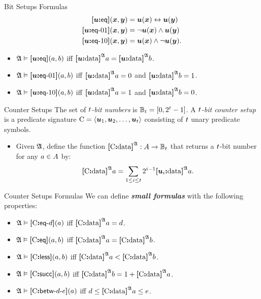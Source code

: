 \documentclass{beamer}
\begin{document}
\begin{frame}{Bit Setups Formulas}
\begin{align*}
  \feq\su(\xx,\yy) &= \su(\xx) \lequ \su(\yy) \\
  \feqOI\su(\xx,\yy) &= \lnot \su(\xx) \land \su(\yy) \\
  \feqIO\su(\xx,\yy) &= \su(\xx) \land \lnot \su(\yy). \\
\end{align*}
\begin{itemize}
  \item
  $\StrA\vDash\feq\su(\ea,\eb)$ iff $\data\su\StrA\ea = \data\su\StrA\eb$.
  
  \item
  $\StrA\vDash\feqOI\su(\ea,\eb)$ iff $\data\su\StrA\ea = 0$ and
  $\data\su\StrA\eb = 1$.
  
  \item
  $\StrA\vDash\feqIO\su(\ea,\eb)$ iff $\data\su\StrA\ea = 1$ and
  $\data\su\StrA\eb = 0$.
\end{itemize}
\end{frame}

\begin{frame}{Counter Setups}
The set of \emph{$\tbit$-bit numbers} is $\Bitnumst = [0, 2^\tbit-1]$.
A \emph{$\tbit$-bit counter setup} is a predicate signature $\CS =
\seq{\suu1,\suu2,\dots,\suu\tbit}$ consisting of $\tbit$ unary predicate
symbols.
\begin{itemize}
  \item
  Given $\StrA$, define the function $\data\CS\StrA : \domA \to \Bitnumst$ that
  returns a $\tbit$-bit number for any $\ea\in\domA$ by:
  \[
    \data\CS\StrA\ea = \sum_{1 \leq \ii \leq \tbit} 2^{\ii-1} 
    \data{\suu\ii}\StrA\ea.
  \]
\end{itemize}
\end{frame}

\begin{frame}{Counter Setups Formulas}
We can define \emph{\textbf{small formulas}} with the following properties:
\begin{itemize}
  \item
  $\StrA\vDash\feqA\CS\datad(\ea)$ iff $\data\CS\StrA\ea = \datad$.
  
  \item
  $\StrA\vDash\feq\CS(\ea,\eb)$ iff $\data\CS\StrA\ea = \data\CS\StrA\eb$.
  
  \item
  $\StrA\vDash\fless\CS(\ea,\eb)$ iff $\data\CS\StrA\ea < \data\CS\StrA\eb$.
  
  \item
  $\StrA\vDash\fsucc\CS(\ea,\eb)$ iff $\data\CS\StrA\eb = 1 +
  \data\CS\StrA\ea$.
  
  \item
  $\StrA \vDash \fbetw\CS\datad\datae(\ea)$ iff
  $\datad \leq \data\CS\StrA\ea \leq \datae$.
\end{itemize}
\end{frame}
\end{document}
